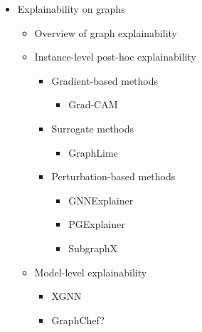 
\begin{itemize}
	\item Explainability on graphs
		\begin{itemize}
			\item Overview of graph explainability
			\item Instance-level post-hoc explainability
				\begin{itemize}
					\item Gradient-based methods
						\begin{itemize}
							\item Grad-CAM
						\end{itemize}
					\item Surrogate methods
						\begin{itemize}
							\item GraphLime
						\end{itemize}
					\item Perturbation-based methods
						\begin{itemize}
							\item GNNExplainer
							\item PGExplainer
							\item SubgraphX
						\end{itemize}
				\end{itemize}
			\item Model-level explainability
				\begin{itemize}
					\item XGNN
					\item GraphChef?
				\end{itemize}
		\end{itemize}
\end{itemize}
